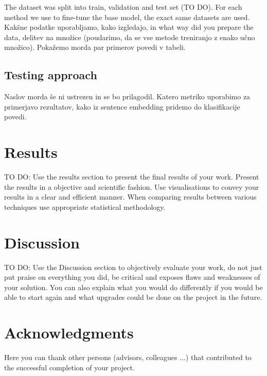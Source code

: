 \documentclass[fleqn,moreauthors,10pt]{ds_report}
\begin{document}
The dataset was split into train, validation and test set (TO DO). For each method we use to fine-tune the base model, the exact same datasets are used.
Kakšne podatke uporabljamo, kako izgledajo, in what way did you prepare the data, delitev na množice (poudarimo, da se vse metode treniranjo z enako učno množico).
Pokažemo morda par primerov povedi v tabeli.


\subsection*{Testing approach}
Naslov morda še ni ustrezen in se bo prilagodil.
Katero metriko uporabimo za primerjavo rezultatov, kako iz sentence embedding pridemo do klasifikacije povedi.






\section*{Results}

TO DO:
Use the results section to present the final results of your work. Present the results in a objective and scientific fashion. Use visualisations to convey your results in a clear and efficient manner. When comparing results between various techniques use appropriate statistical methodology.






\section*{Discussion}

TO DO:
Use the Discussion section to objectively evaluate your work, do not just put praise on everything you did, be critical and exposes flaws and weaknesses of your solution. You can also explain what you would do differently if you would be able to start again and what upgrades could be done on the project in the future.






\section*{Acknowledgments}

Here you can thank other persons (advisors, colleagues ...) that contributed to the successful completion of your project.




\end{document}
